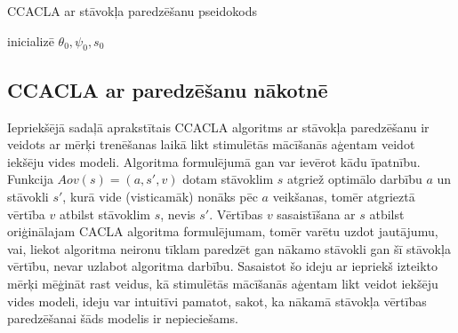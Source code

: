 \documentclass{ludis} %
\begin{document}
\begin{spacing}{1}
\begin{algorithm}
\caption{CCACLA ar stāvokļa paredzēšanu pseidokods}\label{alg:ccacla-state}
inicializē $\theta_0, \psi_0, s_0$ \\
\end{algorithm}
\end{spacing}

\subsection{CCACLA ar paredzēšanu nākotnē}
Iepriekšējā sadaļā aprakstītais CCACLA algoritms ar stāvokļa paredzēšanu ir
veidots ar mērķi trenēšanas laikā likt stimulētās mācīšanās aģentam veidot
iekšēju vides modeli. Algoritma formulējumā gan var ievērot kādu īpatnību.
Funkcija $Aov(s) = (a, s', v)$ dotam stāvoklim $s$ atgriež optimālo darbību $a$
un stāvokli $s'$, kurā vide (visticamāk) nonāks pēc $a$ veikšanas, tomēr
atgrieztā vērtība $v$ atbilst stāvoklim $s$, nevis $s'$. Vērtības $v$
sasaistīšana ar $s$ atbilst oriģinālajam CACLA algoritma formulējumam, tomēr
varētu uzdot jautājumu, vai, liekot algoritma neironu tīklam paredzēt gan nākamo
stāvokli gan šī stāvokļa vērtību, nevar uzlabot algoritma darbību. Sasaistot šo
ideju ar iepriekš izteikto mērķi mēģināt rast veidus, kā stimulētās mācīšanās
aģentam likt veidot iekšēju vides modeli, ideju var intuitīvi pamatot, sakot, ka
nākamā stāvokļa vērtības paredzēšanai šāds modelis ir nepieciešams.
\end{document}
